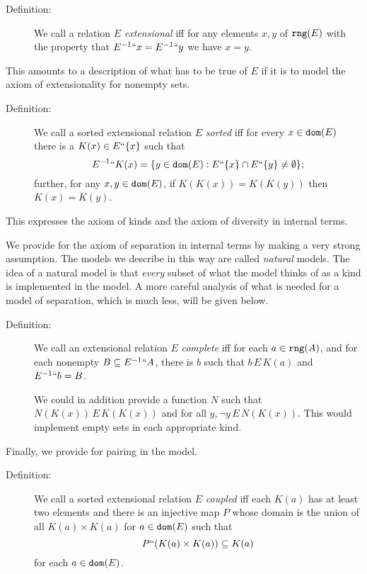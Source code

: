 \documentclass[12pt]{article}
\begin{document}
\begin{description}

\item[Definition:]  We call a relation $E$ {\em extensional\/} iff for any elements $x,y$ of ${\tt rng}(E)$ with the property that $E^{-1}``x = E^{-1}``y$ we have $x=y$.

\end{description}

This amounts to a description of what has to be true of $E$ if it is to model the axiom of extensionality for nonempty sets.

\begin{description}

\item[Definition:]  We call a sorted extensional relation $E$ {\em sorted\/} iff for every $x \in {\tt dom}(E)$ there is a $K(x) \in E``\{x\}$ such that $$E^{-1}``K(x) = \{y \in {\tt dom}(E): E``\{x\} \cap E``\{y\} \neq \emptyset\};$$ further, for any $x,y \in {\tt dom}(E)$, if $K(K(x)) = K(K(y))$ then $K(x)=K(y)$.

\end{description}

This expresses the axiom of kinds and the axiom of diversity in internal terms.

We provide for the axiom of separation in internal terms by making a very strong assumption.  The models we describe in this way are called {\em natural\/} models.  The idea of a natural model is that {\em every\/} subset of what the model thinks of as a kind
is implemented in the model.  A more careful analysis of what is needed for a model of separation, which is much less, will be given below.
\begin{description}
\item[Definition:]  We call an extensional relation $E$ {\em complete\/} iff for each $a \in {\tt rng}(A)$, and for each nonempty $B \subseteq E^{-1}``A$, there is $b$ such that $b \,E\, K(a)$ and $E^{-1}``b = B$.

We could in addition provide a function $N$ such that $N(K(x)) \,E\,K(K(x))$ and for all $y, \neg y\,E\,N(K(x))$.  This would implement empty sets in each appropriate kind.

\end{description}

Finally, we provide for pairing in the model.

\begin{description}

\item[Definition:]  We call a sorted extensional relation $E$ {\em coupled} iff each $K(a)$ has at least two elements and there is an injective map $P$ whose domain is the union of all $K(a) \times K(a)$ for $a \in {\tt dom}(E)$ such that $$P``(K(a) \times K(a)) \subseteq K(a)$$ for each $a \in {\tt dom}(E)$.

\end{description}
\end{document}
